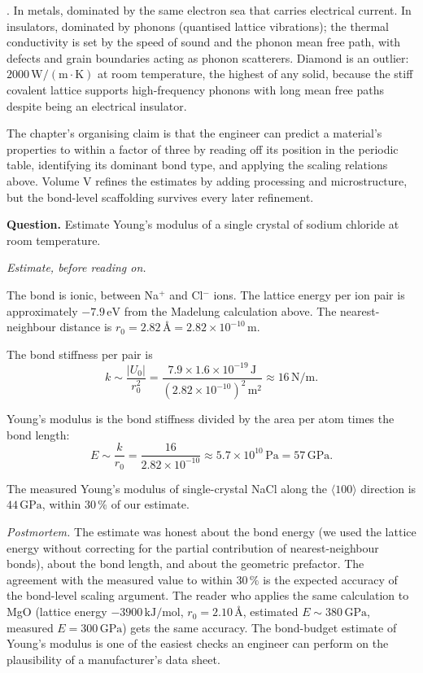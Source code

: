 . In metals, dominated by the same
electron sea that carries electrical current. In insulators, dominated
by phonons (quantised lattice vibrations); the thermal conductivity
is set by the speed of sound and the phonon mean free path, with
defects and grain boundaries acting as phonon scatterers. Diamond is
an outlier: $2000\,\text{W}/(\text{m}\cdot\si{\kelvin})$ at room
temperature, the highest of any solid, because the stiff covalent
lattice supports high-frequency phonons with long mean free paths
despite being an electrical insulator.

The chapter's organising claim is that the engineer can predict a
material's properties to within a factor of three by reading off its
position in the periodic table, identifying its dominant bond type,
and applying the scaling relations above. Volume V refines the
estimates by adding processing and microstructure, but the bond-level
scaffolding survives every later refinement.

\begin{estimation}
\textbf{Question.} Estimate Young's modulus of a single crystal of
sodium chloride at room temperature.

\smallskip
\textit{Estimate, before reading on.}

\smallskip
The bond is ionic, between Na$^+$ and Cl$^-$ ions. The lattice energy
per ion pair is approximately $-7.9\,\text{eV}$ from the Madelung
calculation above. The nearest-neighbour distance is $r_0 = 2.82\,
\si{\angstrom} = 2.82 \times 10^{-10}\,\text{m}$.

The bond stiffness per pair is
\[
k \sim \frac{|U_0|}{r_0^2} = \frac{7.9 \times 1.6 \times 10^{-19}\,\text{J}}{(2.82
\times 10^{-10})^2\,\text{m}^2} \approx 16\,\text{N}/\text{m}.
\]

Young's modulus is the bond stiffness divided by the area per atom
times the bond length:
\[
E \sim \frac{k}{r_0} = \frac{16}{2.82 \times 10^{-10}} \approx 5.7 \times
10^{10}\,\text{Pa} = 57\,\text{GPa}.
\]

The measured Young's modulus of single-crystal NaCl along the
$\langle 100 \rangle$ direction is $44\,\text{GPa}$, within $30\,\%$
of our estimate.

\smallskip
\textit{Postmortem.} The estimate was honest about the bond energy
(we used the lattice energy without correcting for the partial
contribution of nearest-neighbour bonds), about the bond length, and
about the geometric prefactor. The agreement with the measured value
to within $30\,\%$ is the expected accuracy of the bond-level scaling
argument. The reader who applies the same calculation to MgO (lattice
energy $-3900\,\text{kJ}/\text{mol}$, $r_0 = 2.10\,\si{\angstrom}$,
estimated $E \sim 380\,\text{GPa}$, measured $E = 300\,\text{GPa}$)
gets the same accuracy. The bond-budget estimate of Young's modulus
is one of the easiest checks an engineer can perform on the
plausibility of a manufacturer's data sheet.
\end{estimation}

